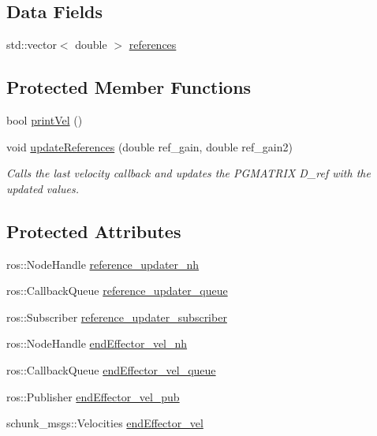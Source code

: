 \subsection*{Data Fields}
\begin{DoxyCompactItemize}
\item 
std\-::vector$<$ double $>$ \hyperlink{classCartesian__velocity__controller_afc3792f1f6dd0025417d752a89e519e1}{references}
\end{DoxyCompactItemize}
\subsection*{Protected Member Functions}
\begin{DoxyCompactItemize}
\item 
bool \hyperlink{classCartesian__velocity__controller_ad5dbfc4b8ec4fad7bca9b9a4fd9358b4}{print\-Vel} ()
\item 
void \hyperlink{classCartesian__velocity__controller_a9b2c7f25b3fc2882f7e4590ee97e0978}{update\-References} (double ref\-\_\-gain, double ref\-\_\-gain2)
\begin{DoxyCompactList}\small\item\em Calls the last velocity callback and updates the P\-G\-M\-A\-T\-R\-I\-X D\-\_\-ref with the updated values. \end{DoxyCompactList}\end{DoxyCompactItemize}
\subsection*{Protected Attributes}
\begin{DoxyCompactItemize}
\item 
ros\-::\-Node\-Handle \hyperlink{classCartesian__velocity__controller_a7d04d378a2a6d19870a620883dcd3e09}{reference\-\_\-updater\-\_\-nh}
\item 
ros\-::\-Callback\-Queue \hyperlink{classCartesian__velocity__controller_ad2804cf83a42305d18572abdbbfd1c3f}{reference\-\_\-updater\-\_\-queue}
\item 
ros\-::\-Subscriber \hyperlink{classCartesian__velocity__controller_a75412b9859afe4b800f9613c9cb8d17f}{reference\-\_\-updater\-\_\-subscriber}
\item 
ros\-::\-Node\-Handle \hyperlink{classCartesian__velocity__controller_a01cbe7f951c69ded8604e552a0a706e0}{end\-Effector\-\_\-vel\-\_\-nh}
\item 
ros\-::\-Callback\-Queue \hyperlink{classCartesian__velocity__controller_af154b0cda931081b52224eb22e4680f7}{end\-Effector\-\_\-vel\-\_\-queue}
\item 
ros\-::\-Publisher \hyperlink{classCartesian__velocity__controller_ab12287816ae785d3cd6243b3df0cffc6}{end\-Effector\-\_\-vel\-\_\-pub}
\item 
schunk\-\_\-msgs\-::\-Velocities \hyperlink{classCartesian__velocity__controller_ae771d963a90ad7b844c4c3a821ce5f39}{end\-Effector\-\_\-vel}
\end{DoxyCompactItemize}



